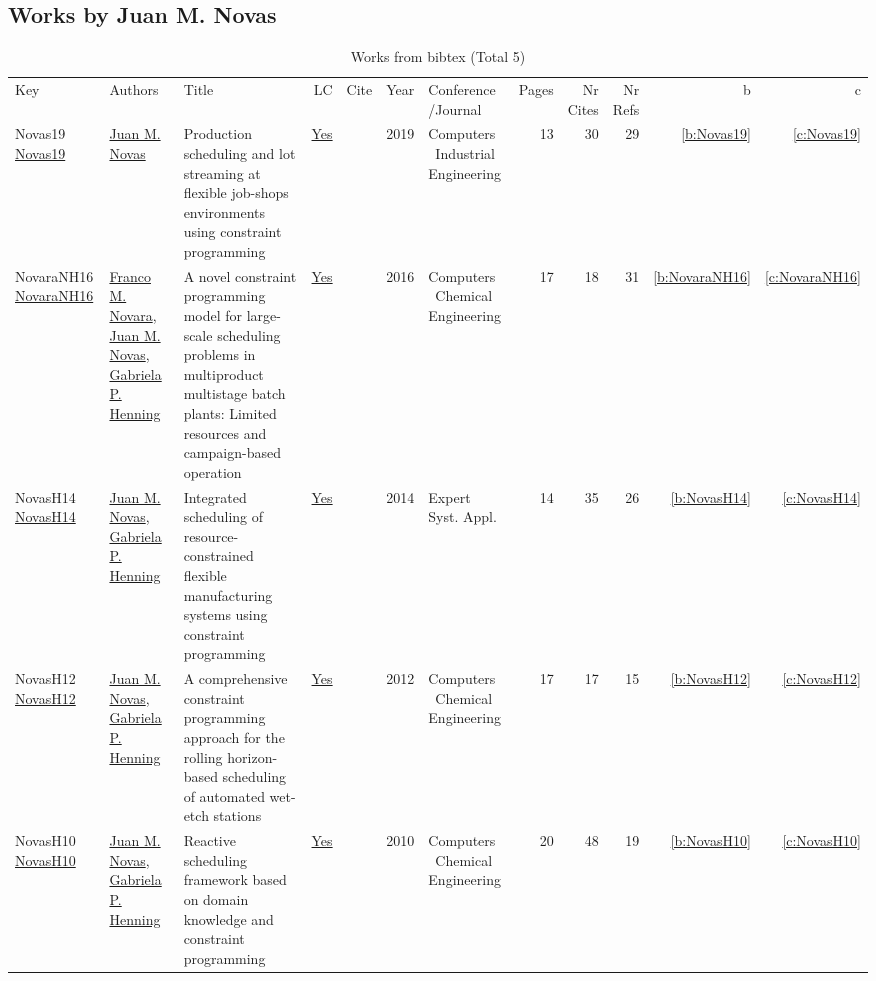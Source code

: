 \subsection{Works by Juan M. Novas}
\label{sec:a531}
{\scriptsize
\begin{longtable}{>{\raggedright\arraybackslash}p{3cm}>{\raggedright\arraybackslash}p{6cm}>{\raggedright\arraybackslash}p{6.5cm}rrrp{2.5cm}rrrrr}
\rowcolor{white}\caption{Works from bibtex (Total 5)}\\ \toprule
\rowcolor{white}Key & Authors & Title & LC & Cite & Year & \shortstack{Conference\\/Journal} & Pages & \shortstack{Nr\\Cites} & \shortstack{Nr\\Refs} & b & c \\ \midrule\endhead
\bottomrule
\endfoot
Novas19 \href{https://doi.org/10.1016/j.cie.2019.07.011}{Novas19} & \hyperref[auth:a531]{Juan M. Novas} & Production scheduling and lot streaming at flexible job-shops environments using constraint programming & \href{works/Novas19.pdf}{Yes} & \cite{Novas19} & 2019 & Computers \  Industrial Engineering & 13 & 30 & 29 & \ref{b:Novas19} & \ref{c:Novas19}\\
NovaraNH16 \href{https://doi.org/10.1016/j.compchemeng.2016.04.030}{NovaraNH16} & \hyperref[auth:a597]{Franco M. Novara}, \hyperref[auth:a531]{Juan M. Novas}, \hyperref[auth:a598]{Gabriela P. Henning} & A novel constraint programming model for large-scale scheduling problems in multiproduct multistage batch plants: Limited resources and campaign-based operation & \href{works/NovaraNH16.pdf}{Yes} & \cite{NovaraNH16} & 2016 & Computers \  Chemical Engineering & 17 & 18 & 31 & \ref{b:NovaraNH16} & \ref{c:NovaraNH16}\\
NovasH14 \href{https://doi.org/10.1016/j.eswa.2013.09.026}{NovasH14} & \hyperref[auth:a531]{Juan M. Novas}, \hyperref[auth:a598]{Gabriela P. Henning} & Integrated scheduling of resource-constrained flexible manufacturing systems using constraint programming & \href{works/NovasH14.pdf}{Yes} & \cite{NovasH14} & 2014 & Expert Syst. Appl. & 14 & 35 & 26 & \ref{b:NovasH14} & \ref{c:NovasH14}\\
NovasH12 \href{https://doi.org/10.1016/j.compchemeng.2012.01.005}{NovasH12} & \hyperref[auth:a531]{Juan M. Novas}, \hyperref[auth:a598]{Gabriela P. Henning} & A comprehensive constraint programming approach for the rolling horizon-based scheduling of automated wet-etch stations & \href{works/NovasH12.pdf}{Yes} & \cite{NovasH12} & 2012 & Computers \  Chemical Engineering & 17 & 17 & 15 & \ref{b:NovasH12} & \ref{c:NovasH12}\\
NovasH10 \href{https://doi.org/10.1016/j.compchemeng.2010.07.011}{NovasH10} & \hyperref[auth:a531]{Juan M. Novas}, \hyperref[auth:a598]{Gabriela P. Henning} & Reactive scheduling framework based on domain knowledge and constraint programming & \href{works/NovasH10.pdf}{Yes} & \cite{NovasH10} & 2010 & Computers \  Chemical Engineering & 20 & 48 & 19 & \ref{b:NovasH10} & \ref{c:NovasH10}\\
\end{longtable}
}

